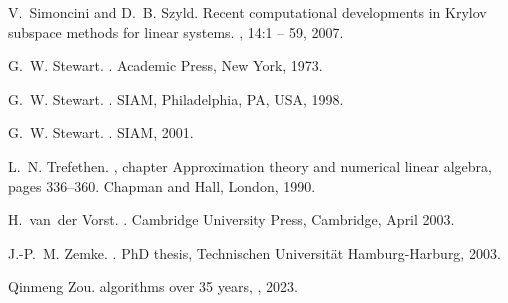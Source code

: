 \documentclass{article}
\begin{document}
\begin{thebibliography}{100}
 
     V.~Simoncini and D.~B. Szyld. \newblock Recent computational developments in
    {Krylov} subspace methods for
  linear systems.
, 14:1 -- 59, 2007.

	
     G.~W. Stewart. . \newblock
    Academic Press, New York, 1973.

     G.~W. Stewart. .
    \newblock SIAM, Philadelphia, PA, USA, 1998.


	 G.~W. Stewart. . \newblock
	SIAM, 2001.
	
	 L.~N. Trefethen. , chapter
    Approximation theory
  and numerical linear algebra, pages 336--360.
\newblock Chapman and Hall, London, 1990.


	
	
 H.~van~der Vorst. .
\newblock Cambridge University Press, Cambridge, April 2003.
	
	

	

 J.-P.~M. Zemke. .
\newblock PhD thesis, Technischen Universität Hamburg-Harburg, 2003.
	
	
  Qinmeng Zou.
 algorithms over 35 years,
   ,
 2023.
		



	
	
	\markboth{}{}
	
\end{thebibliography}
\end{document}
